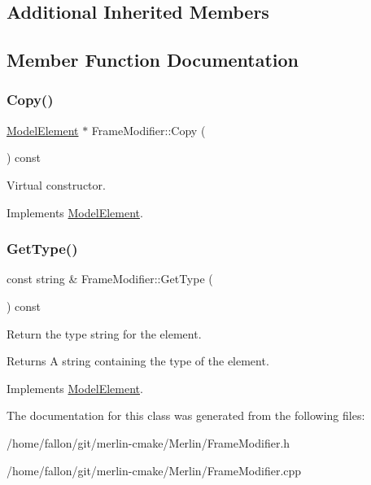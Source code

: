 \subsection*{Additional Inherited Members}


\subsection{Member Function Documentation}
\mbox{\label{classFrameModifier_a26eef02b3d5e008da70d9cece9f018e4}} 
\subsubsection{\texorpdfstring{Copy()}{Copy()}}
{\footnotesize\ttfamily \hyperlink{classModelElement}{Model\+Element} $\ast$ Frame\+Modifier\+::\+Copy (\begin{DoxyParamCaption}{ }\end{DoxyParamCaption}) const\hspace{0.3cm}{\ttfamily [virtual]}}

Virtual constructor. 

Implements \hyperlink{classModelElement_ac3ca26d649bd86a0f31a58ae09941429}{Model\+Element}.

\mbox{\label{classFrameModifier_aeed9502abd0561668d9d654a08fef546}} 
\subsubsection{\texorpdfstring{Get\+Type()}{GetType()}}
{\footnotesize\ttfamily const string \& Frame\+Modifier\+::\+Get\+Type (\begin{DoxyParamCaption}{ }\end{DoxyParamCaption}) const\hspace{0.3cm}{\ttfamily [virtual]}}

Return the type string for the element. \begin{DoxyReturn}{Returns}
A string containing the type of the element. 
\end{DoxyReturn}


Implements \hyperlink{classModelElement_a04dc2e51e1999fca612eb1838ec6b271}{Model\+Element}.



The documentation for this class was generated from the following files\+:\begin{DoxyCompactItemize}
\item 
/home/fallon/git/merlin-\/cmake/\+Merlin/Frame\+Modifier.\+h\item 
/home/fallon/git/merlin-\/cmake/\+Merlin/Frame\+Modifier.\+cpp\end{DoxyCompactItemize}
